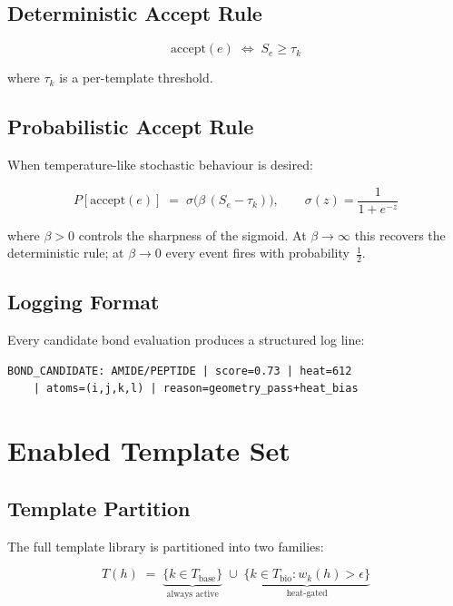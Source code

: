 \documentclass[11pt]{article}
\begin{document}
\subsection{Deterministic Accept Rule}

\begin{equation}
\label{eq:det_accept}
\mathrm{accept}(e) \;\Longleftrightarrow\; S_e \ge \tau_k
\end{equation}

where $\tau_k$ is a per-template threshold.

\subsection{Probabilistic Accept Rule}

When temperature-like stochastic behaviour is desired:

\begin{equation}
\label{eq:prob_accept}
P[\mathrm{accept}(e)] \;=\; \sigma\!\bigl(\beta\,(S_e - \tau_k)\bigr),
\qquad
\sigma(z) = \frac{1}{1 + e^{-z}}
\end{equation}

where $\beta > 0$ controls the sharpness of the sigmoid.  At
$\beta \to \infty$ this recovers the deterministic rule; at $\beta \to 0$
every event fires with probability~$\tfrac{1}{2}$.

\subsection{Logging Format}

Every candidate bond evaluation produces a structured log line:

\begin{lstlisting}[language={}]
BOND_CANDIDATE: AMIDE/PEPTIDE | score=0.73 | heat=612
    | atoms=(i,j,k,l) | reason=geometry_pass+heat_bias
\end{lstlisting}

\section{Enabled Template Set}

\subsection{Template Partition}

The full template library is partitioned into two families:

\begin{equation}
\label{eq:template_set}
T(h) \;=\;
\underbrace{\{k \in T_{\mathrm{base}}\}}_{\text{always active}}
\;\cup\;
\underbrace{\{k \in T_{\mathrm{bio}} : w_k(h) > \epsilon\}}_{\text{heat-gated}}
\end{equation}
\end{document}
